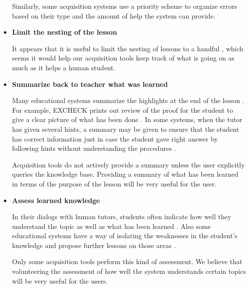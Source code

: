 \documentclass{llncs}
\begin{document}
\begin{itemize}
\vspace*{0.5em}
Similarly, some acquisition systems use a priority scheme to organize errors
based on their type and the amount of help the system can provide.

\vspace*{0.5em}
\item {\bf Limit the nesting of the lesson}

It appears that it is useful to limit the nesting of lessons to a handful
\cite{VanLehn00}, which seems it would help our acquisition tools keep track
of what is going on as much as it helps a human student.

\vspace*{0.5em}
\item {\bf Summarize back to teacher what was learned}

Many educational systems summarize the highlights at the end of the lesson
\cite{woolf84,McDonald81}. For example, EXCHECK prints out review of the proof
for the student to give a clear picture of what has been done
\cite{McDonald81}.  In some systems, when the tutor has given several hints, a
summary may be given to ensure that the student has correct information just
in case the student gave right answer by following hints without understanding
the procedures \cite{WoolfA00}.

\vspace*{0.5em}
Acquisition tools do not actively provide a summary unless the user
explicitly queries the knowledge base.  Providing a summary of what has been
learned in terms of the purpose of the lesson will be very useful for the
user.

\vspace*{0.5em}
\item {\bf Assess learned knowledge}

In their dialogs with human tutors, students often indicate how well they
understand the topic as well as what has been learned \cite{Fox93}.
Also some educational systems have a way of isolating the weaknesses in the
student's knowledge and propose further lessons on those areas \cite{Burton79}.

\vspace*{0.5em}
Only some acquisition tools perform this kind of assessment.  We
believe that volunteering the assessment of how well the system understands
certain topics will be very useful for the users.


\end{itemize}
\end{document}
